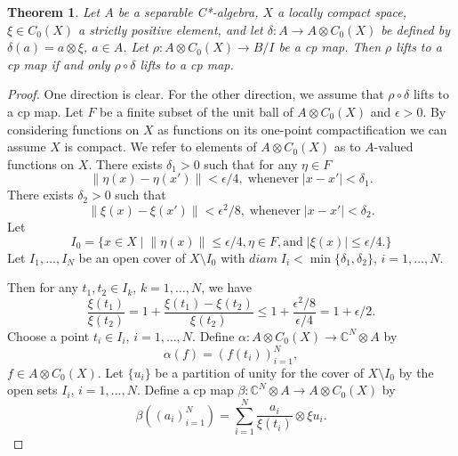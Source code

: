 \documentclass{article}%
\newtheorem{theorem}{Theorem}
\begin{document}
\begin{theorem}\label{LiftingDuality}   Let $A$  be a separable C*-algebra, $X$ a locally compact space, $\xi\in C_0(X)$ a strictly positive element, and let $\delta: A \to A\otimes C_0(X)$ be defined by $\delta(a)= a\otimes \xi$, $a\in A$. Let    $\rho: A\otimes C_0(X)\to B/I$  be a cp map.  Then $\rho$  lifts to a cp map if and only $\rho\circ\delta$ lifts to a cp map.
\end{theorem}
\begin{proof} One direction is clear. For the other direction,  we assume that $\rho\circ\delta$ lifts to a cp map. Let $F$ be a finite subset of the unit ball of $A\otimes C_0(X)$ and  $\epsilon >0$. By considering functions on $X$ as functions on its one-point compactification we can assume $X$ is compact. We refer to elements of $A\otimes C_0(X)$ as to $A$-valued functions on $X$.   There exists $\delta_1>0$ such that for any $\eta\in F$
\begin{equation}\label{LiftingDuality01}\|\eta(x) - \eta(x')\|< \epsilon/4, \;\text{whenever}\; |x-x'|< \delta_1.\end{equation}
There exists $\delta_2>0$ such that \begin{equation}\label{LiftingDuality2}\|\xi(x) - \xi(x')\|< \epsilon^2/8, \;\text{whenever}\; |x-x'|< \delta_2.\end{equation} Let
$$I_0 = \{x\in X\;|\; \|\eta(x)\|\le \epsilon/4, \eta\in F, \text{and}\; |\xi(x)|\le\epsilon/4.\}$$
Let $I_1, \ldots, I_N$ be  an open cover of $X\setminus I_0$ with $diam\; I_i < \min\{\delta_1, \delta_2\}$, $i=1, \ldots, N$.


Then for any $t_1, t_2\in I_k$, $k = 1, \ldots,  N$, we have
\begin{equation}\label{fraction} \frac{\xi(t_1)}{\xi(t_2)} = 1+ \frac{\xi(t_1) - \xi(t_2)}{\xi(t_2)} \le 1+ \frac{\epsilon^2/8}{\epsilon/4} =1+ \epsilon/2.
\end{equation}
Choose a point $t_i\in I_i$, $i = 1, \ldots, N$. Define  $\alpha: A\otimes C_0(X) \to \mathbb C^N\otimes A $ by
$$\alpha(f) = \left(f(t_i)\right)_{i=1}^N, $$ $f\in A\otimes C_0(X)$. Let $\{u_i\}$ be a partition of unity for the cover of $X\setminus I_0$ by the open sets $I_i$, $i = 1, \ldots, N$. Define a cp map $\beta: \mathbb C^N\otimes A \to A\otimes C_0(X)$ by
$$\beta\left(\left(a_i\right)_{i=1}^N\right) = \sum_{i=1}^N \frac{a_i}{\xi(t_i)}\otimes \xi u_i.$$


\end{proof}
\end{document}
